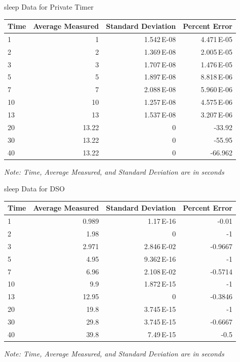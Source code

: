 \documentclass[pdf]{beamer}
\begin{document}
\begin{frame}{sleep Data for Private Timer}
  \begin{center}
    \begin{tabular}{lrrr}
      Time & Average Measured & Standard Deviation & Percent Error\\
      \hline
      1 & 1 & 1.542\,E-08 & 4.471\,E-05\\
      2 & 2 & 1.369\,E-08 & 2.005\,E-05\\
      3 & 3 & 1.707\,E-08 & 1.476\,E-05\\
      5 & 5 & 1.897\,E-08 & 8.818\,E-06\\
      7 & 7 & 2.088\,E-08 & 5.960\,E-06\\
      10 & 10 & 1.257\,E-08 & 4.575\,E-06\\
      13 & 13 & 1.537\,E-08 & 3.207\,E-06\\
      20 & 13.22 & 0 & -33.92\\
      30 & 13.22 & 0 & -55.95\\
      40 & 13.22 & 0 & -66.962\\
      \hline
    \end{tabular}
  \end{center}
  \small\emph{Note: Time, Average Measured, and Standard Deviation are in seconds}

\end{frame}

\begin{frame}{sleep Data for DSO}
  
  \begin{center}
    \begin{tabular}{lrrr}
      Time & Average Measured & Standard Deviation & Percent Error\\
      \hline
      1 & 0.989 & 1.17\,E-16 & -0.01\\
      2 & 1.98 & 0 & -1\\
      3 & 2.971 & 2.846\,E-02 & -0.9667\\
      5 & 4.95 & 9.362\,E-16 & -1\\
      7 & 6.96 & 2.108\,E-02 & -0.5714\\
      10 & 9.9 & 1.872\,E-15 & -1\\
      13 & 12.95 & 0 & -0.3846\\
      20 & 19.8 & 3.745\,E-15 & -1\\
      30 & 29.8 & 3.745\,E-15 & -0.6667\\
      40 & 39.8 & 7.49\,E-15 & -0.5\\
      \hline
    \end{tabular}
  \end{center}
  \small\emph{Note: Time, Average Measured, and Standard Deviation are in seconds}

\end{frame}
\end{document}
